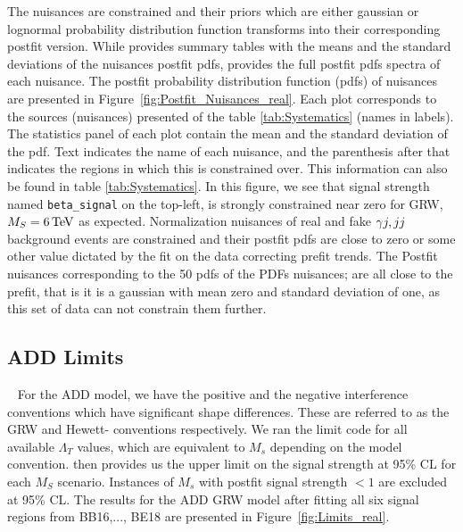 The nuisances are constrained and their priors which are either gaussian or lognormal probability distribution function transforms into their corresponding postfit version. While \COMBINE provides summary tables with the means and the standard deviations of the nuisances postfit pdfs, \THETA provides the full postfit pdfs spectra of each nuisance. The postfit probability distribution function (pdfs) of nuisances are presented in Figure~\ref{fig:Postfit_Nuisances_real}. Each plot corresponds to the sources (nuisances) presented of the table \ref{tab:Systematics} (names in labels). The statistics panel of each plot contain the mean and the standard deviation of the pdf.
Text indicates the name of each nuisance, and the parenthesis after that indicates the regions in which this is constrained over. This information can also be found in table \ref{tab:Systematics}. In this figure, we see that signal strength named \texttt{beta\_signal} on the top-left, is strongly constrained near zero for GRW, $M_S=6\,\text{Te\hspace{-.08em}V}$ as expected. Normalization nuisances of real \gmgm and fake $\gamma j,jj$ background events are constrained and their postfit pdfs are close to zero or some other value dictated by the fit on the data correcting prefit trends. The Postfit nuisances corresponding to the 50 pdfs of the PDFs nuisances; are all close to the prefit, that is it is a gaussian with mean zero and standard deviation of one, as this set of data can not constrain them further.

\subsection{ADD Limits}~\label{sec:ADDlimits}
For the ADD model, we have the positive and the negative interference conventions which have significant shape differences. These are referred to as the GRW and Hewett- conventions respectively. We ran the limit code for all available $\Lambda_T$ values, which are equivalent to $M_s$ depending on the model convention. \THETA then provides us the upper limit on the signal strength at 95\% CL for each $M_S$ scenario. Instances of $M_s$ with postfit signal strength $<1$ are excluded at 95\% CL. The results for the ADD GRW model after fitting all six signal regions from BB16,..., BE18 are presented in Figure~\ref{fig:Limits_real}.

